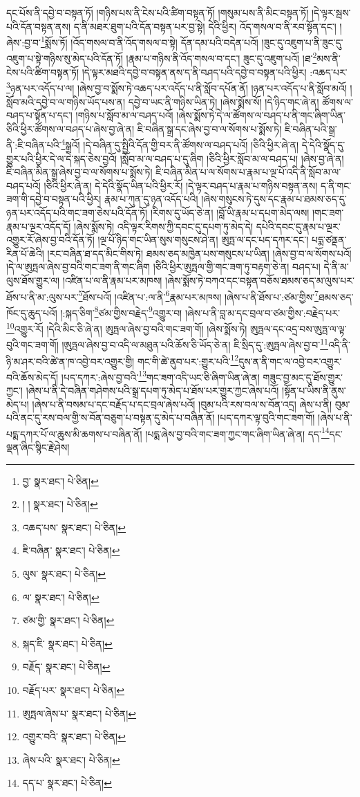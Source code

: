 དང་པོས་ནི་དབྱེ་བ་བསྟན་ཏོ། །གཉིས་པས་ནི་ངེས་པའི་ཚིག་བསྟན་ཏོ། །གསུམ་པས་ནི་མིང་བསྟན་ཏོ། །དེ་ལྟར་སྦས་པའི་དོན་བསྟན་ནས། ད་ནི་མཐར་ཐུག་པའི་དོན་བསྟན་པར་བྱ་སྟེ། དེའི་ཕྱིར། འོད་གསལ་བ་ནི་རབ་སྟོན་དང་། །ཞེས་:བྱ་བ་\footnote{བྱ་  སྣར་ཐང་།  པེ་ཅིན། }སྨོས་ཏོ། །འོད་གསལ་བ་ནི་འོད་གསལ་བ་སྟེ། དོན་དམ་པའི་བདེན་པའོ། །ཟུང་དུ་འཇུག་པ་ནི་ཟུང་དུ་འཇུག་པ་སྟེ་གཉིས་སུ་མེད་པའི་དོན་ཏོ། །རྣམ་པ་གཉིས་ནི་འོད་གསལ་བ་དང་། ཟུང་དུ་འཇུག་པའོ། །ཐ་\footnote{། །  སྣར་ཐང་།  པེ་ཅིན། }མས་ནི་ངེས་པའི་ཚིག་བསྟན་ཏོ། །དེ་ལྟར་མཐའི་དབྱེ་བ་བསྟན་ནས་ད་ནི་བཤད་པའི་དབྱེ་བ་བསྟན་པའི་ཕྱིར། :འཆད་པར་\footnote{འཆད་པས་  སྣར་ཐང་།  པེ་ཅིན། }ཉན་པར་འདོད་པ་ལ། །ཞེས་བྱ་བ་སྨོས་ཏེ་འཆད་པར་འདོད་པ་ནི་སློབ་དཔོན་ནོ། །ཉན་པར་འདོད་པ་ནི་སློབ་མའོ། །སློབ་མའི་དབྱེ་བ་ལ་གཉིས་ཡོད་པས་ན། དབྱེ་བ་ཡང་ནི་གཉིས་ཡིན་ཏེ། །ཞེས་སྨོས་སོ། །དེ་ཉིད་གང་ཞེ་ན། ཚོགས་ལ་བཤད་པ་སྟོན་པ་དང་། །གཉིས་པ་སློབ་མ་ལ་བཤད་པའོ། །ཞེས་སྨོས་ཏེ་དེ་ལ་ཚོགས་ལ་བཤད་པ་ནི་གང་ཞིག་ཡིན་ཅིའི་ཕྱིར་ཚོགས་ལ་བཤད་པ་ཞེས་བྱ་ཞེ་ན། ཇི་བཞིན་སྒྲ་དང་ཞེས་བྱ་བ་ལ་སོགས་པ་སྨོས་ཏེ། ཇི་བཞིན་པའི་སྒྲ་ནི་:ཇི་བཞིན་པའི་\footnote{ཇི་བཞིན་  སྣར་ཐང་།  པེ་ཅིན། }སྒྲའོ། །དེ་བཞིན་དུ་སྤྱིའི་དོན་གྱི་བར་ནི་ཚོགས་ལ་བཤད་པའོ། །ཅིའི་ཕྱིར་ཞེ་ན། དེ་དེའི་སྣོད་དུ་གྱུར་པའི་ཕྱིར་དེ་ལ་དེ་སྐད་ཅེས་བྱའོ། །སློབ་མ་ལ་བཤད་པ་དུ་ཞིག །ཅིའི་ཕྱིར་སློབ་མ་ལ་བཤད་པ། །ཞེས་བྱ་ཞེ་ན། ཇི་བཞིན་མིན་སྒྲ་ཞེས་བྱ་བ་ལ་སོགས་པ་སྨོས་ཏེ། ཇི་བཞིན་མིན་པ་ལ་སོགས་པ་རྣམ་པ་ལྔ་པོ་འདི་ནི་སློབ་མ་ལ་བཤད་པའོ། །ཅིའི་ཕྱིར་ཞེ་ན། དེ་དེའི་སྣོད་ཡིན་པའི་ཕྱིར་རོ། །དེ་ལྟར་བཤད་པ་རྣམ་པ་གཉིས་བསྟན་ནས། ད་ནི་གང་ཟག་གི་དབྱེ་བ་བསྟན་པའི་ཕྱིར། རྣམ་པ་ཀུན་དུ་ཉན་འདོད་པའི། །ཞེས་གསུངས་ཏེ་དུས་དང་རྣམ་པ་ཐམས་ཅད་དུ་ཉན་པར་འདོད་པའི་གང་ཟག་ཅེས་པའི་དོན་ཏོ། །རིགས་དུ་ཡོད་ཅེ་ན། །བློ་ཡི་རྣམ་པ་དཔག་མེད་ལས། །གང་ཟག་རྣམ་པ་ལྔར་འདོད་དོ། །ཞེས་སྨོས་ཏེ། འདི་ལྟར་རིགས་ཀྱི་དབང་དུ་དཔག་ཏུ་མེད་དེ། དཔེའི་དབང་དུ་རྣམ་པ་ལྔར་འགྱུར་རོ་ཞེས་བྱ་བའི་དོན་ཏོ། །ལྔ་པོ་ཉིད་གང་ཡིན་སུས་གསུངས་ཤེ་ན། ཨུཏྤ་ལ་དང་པད་དཀར་དང་། པདྨ་ཙནྡན་རིན་པོ་ཆེའི། །རང་བཞིན་ཐ་དད་མིང་གིས་ཏེ། ཐམས་ཅད་མཁྱེན་པས་གསུངས་པ་ཡིན། །ཞེས་བྱ་བ་ལ་སོགས་པའོ། །དེ་ལ་ཨུཏྤལ་ཞེས་བྱ་བའི་གང་ཟག་ནི་གང་ཞིག །ཅིའི་ཕྱིར་ཨུཏྤལ་གྱི་གང་ཟག་ཏུ་བརྟག་ཅེ་ན། བཤད་པ། དེ་ནི་མ་ལུས་ཐོས་གྱུར་ལ། །འཛིན་པ་ལ་ནི་རྣམ་པར་མཁས། །ཞེས་སྨོས་ཏེ་བཀའ་དང་བསྟན་བཅོས་ཐམས་ཅད་མ་ལུས་པར་ཐོས་པ་ནི་མ་:ལུས་པར་\footnote{ལུས་  སྣར་ཐང་།  པེ་ཅིན། }ཐོས་པའོ། །འཛིན་པ་:ལ་ནི་\footnote{ལ་  སྣར་ཐང་།  པེ་ཅིན། }རྣམ་པར་མཁས། །ཞེས་པ་ནི་ཐོས་པ་:ཙམ་གྱིས་\footnote{ཙམ་གྱི་  སྣར་ཐང་།  པེ་ཅིན། }ཐམས་ཅད་ཁོང་དུ་ཆུད་པའོ། །:སྐད་ཅིག་\footnote{སྐད་ཇི་  སྣར་ཐང་།  པེ་ཅིན། }ཙམ་གྱིས་བརྗེད་\footnote{བརྗོད་  སྣར་ཐང་།  པེ་ཅིན། }འགྱུར་བ། །ཞེས་པ་ནི་བླ་མ་དང་བྲལ་བ་ཙམ་གྱིས་:བརྗེད་པར་\footnote{བརྗོད་པར་  སྣར་ཐང་།  པེ་ཅིན། }འགྱུར་རོ། །དེའི་མིང་ཅི་ཞེ་ན། ཨུཏྤལ་ཞེས་བྱ་བའི་གང་ཟག་གོ། །ཞེས་སྨོས་ཏེ། ཨུཏྤལ་དང་འདྲ་བས་ཨུཏྤ་ལ་ལྟ་བུའི་གང་ཟག་གོ། །ཨུཏྤལ་ཞེས་བྱ་བ་འདི་ལ་མཐུན་པའི་ཆོས་ཅི་ཡོད་ཅེ་ན། ཇི་སྲིད་དུ་:ཨུཏྤལ་ཞེས་བྱ་བ་\footnote{ཨུཏྤལ་ཞེས་པ་  སྣར་ཐང་།  པེ་ཅིན། }འདི་ནི་ཉི་མ་ཤར་བའི་ཚེ་ན་ཁ་འབྱེ་བར་འགྱུར་གྱི། གང་གི་ཚེ་ནུབ་པར་:གྱུར་པའི་\footnote{འགྱུར་བའི་  སྣར་ཐང་།  པེ་ཅིན། }དུས་ན་ནི་གང་ལ་འབྱེ་བར་འགྱུར་བའི་ཆོས་མེད་དོ། །པད་དཀར་:ཞེས་བྱ་བའི་\footnote{ཞེས་པའི་  སྣར་ཐང་།  པེ་ཅིན། }གང་ཟག་འདི་ཡང་ཅི་ཞིག་ཡིན་ཞེ་ན། གཟུང་བྱ་མང་དུ་ཐོས་གྱུར་ཀྱང་། །ཞེས་པ་ནི་དེ་བཞིན་གཤེགས་པའི་སྒྲ་དཔག་ཏུ་མེད་པ་ཐོས་པར་གྱུར་ཀྱང་ཞེས་པའོ། །སྟོན་པ་ཡིས་ནི་ནུས་མེད་པ། །ཞེས་པ་ནི་བསམ་པ་དང་བརྗོད་པ་དང་བྲལ་ཞེས་པའོ། །བུམ་པའི་རས་བལ་ས་བོན་འདྲ། ཞེས་པ་ནི། བུམ་པའི་ནང་དུ་རས་བལ་གྱི་ས་བོན་བཅུག་པ་བསྟན་དུ་མེད་པ་བཞིན་ནོ། །པད་དཀར་ལྟ་བུའི་གང་ཟག་གོ། །ཞེས་པ་ནི་པདྨ་དཀར་པོ་ལ་ཆུས་མི་ཆགས་པ་བཞིན་ནོ། །པདྨ་ཞེས་བྱ་བའི་གང་ཟག་ཀྱང་གང་ཞིག་ཡིན་ཞེ་ན། དད་\footnote{དད་པ་  སྣར་ཐང་།  པེ་ཅིན། }དང་ལྡན་ཞིང་སྙིང་རྗེ་ཤེས། 